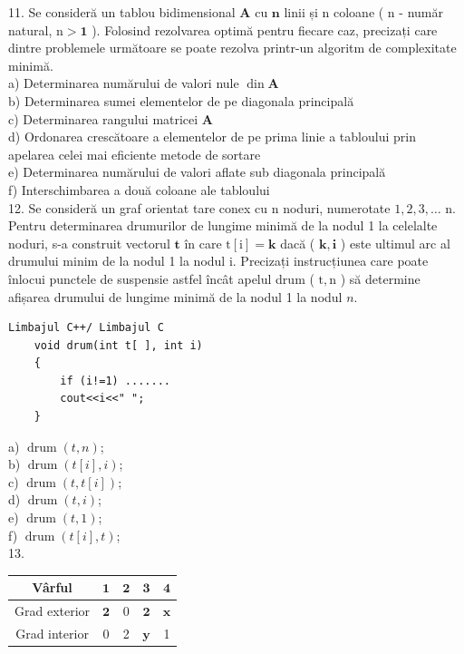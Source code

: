 \documentclass[10pt]{article}
\begin{document}
11. Se consideră un tablou bidimensional $\mathbf{A}$ cu $\mathbf{n}$ linii și n coloane ( n - număr natural, $\mathrm{n}>\mathbf{1}$ ). Folosind rezolvarea optimă pentru fiecare caz, precizați care dintre problemele următoare se poate rezolva printr-un algoritm de complexitate minimă.\\
a) Determinarea numărului de valori nule $\operatorname{din} \mathbf{A}$\\
b) Determinarea sumei elementelor de pe diagonala principală\\
c) Determinarea rangului matricei $\mathbf{A}$\\
d) Ordonarea crescătoare a elementelor de pe prima linie a tabloului prin apelarea celei mai eficiente metode de sortare\\
e) Determinarea numărului de valori aflate sub diagonala principală\\
f) Interschimbarea a două coloane ale tabloului\\
12. Se consideră un graf orientat tare conex cu n noduri, numerotate $1,2,3, \ldots$ n. Pentru determinarea drumurilor de lungime minimă de la nodul 1 la celelalte noduri, s-a construit vectorul $\mathbf{t}$ în care $\mathrm{t}[\mathrm{i}]=\mathbf{k}$ dacă ( $\mathbf{k}, \mathbf{i}$ ) este ultimul arc al drumului minim de la nodul 1 la nodul i. Precizați instrucțiunea care poate înlocui punctele de suspensie astfel încât apelul drum ( $\mathrm{t}, \mathrm{n}$ ) să determine afișarea drumului de lungime minimă de la nodul 1 la nodul $n$.

\begin{verbatim}
Limbajul C++/ Limbajul C
    void drum(int t[ ], int i)
    {
        if (i!=1) .......
        cout<<i<<" ";
    }
\end{verbatim}

a) $\operatorname{drum}(t, n)$;\\
b) $\operatorname{drum}(t[i], i)$;\\
c) $\operatorname{drum}(t, t[i])$;\\
d) $\operatorname{drum}(t, i)$;\\
e) $\operatorname{drum}(t, 1)$;\\
f) $\operatorname{drum}(t[i], t)$;\\
13.

\begin{center}
\begin{tabular}{|c|c|c|c|c|}
\hline
Vârful & $\mathbf{1}$ & $\mathbf{2}$ & $\mathbf{3}$ & $\mathbf{4}$ \\
\hline
Grad exterior & $\mathbf{2}$ & 0 & $\mathbf{2}$ & $\mathbf{x}$ \\
\hline
Grad interior & 0 & 2 & $\mathbf{y}$ & 1 \\
\hline
\end{tabular}
\end{center}
\end{document}
